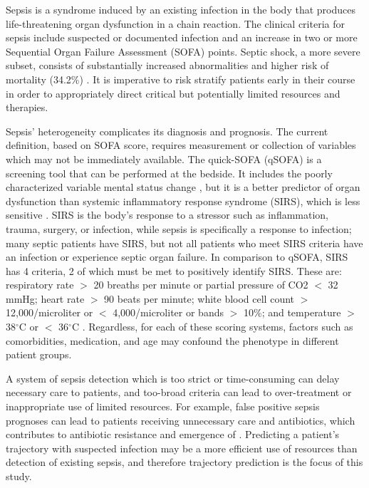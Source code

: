 
Sepsis is a syndrome induced by an existing infection in the body that produces life-threatening organ dysfunction in a chain reaction. The clinical criteria for sepsis include suspected or documented infection and an increase in two or more Sequential Organ Failure Assessment (SOFA) points. Septic shock, a more severe subset, consists of substantially increased abnormalities \cite{sepsis-3} and higher risk of mortality (34.2\%) \cite{paoli_epidemiology_2018}. It is imperative to risk stratify patients early in their course in order to appropriately direct critical but potentially limited resources and therapies.

Sepsis' heterogeneity complicates its diagnosis and prognosis. The current definition, based on SOFA score, requires measurement or collection of variables which may not be immediately available. The quick-SOFA (qSOFA) is a screening tool that can be performed at the bedside. It includes the poorly characterized variable mental status change \cite{sepsis-3}, but it is a better predictor of organ dysfunction than systemic inflammatory response syndrome (SIRS), which is less sensitive \cite{sirs_1992, seymour_assessment_2016}. SIRS is the body's response to a stressor such as inflammation, trauma, surgery, or infection, while sepsis is specifically a response to infection; many septic patients have SIRS, but not all patients who meet SIRS criteria have an infection or experience septic organ failure. In comparison to qSOFA, SIRS has 4 criteria, 2 of which must be met to positively identify SIRS. These are: respiratory rate $>$ 20 breaths per minute or partial pressure of CO2 $<$ 32 mmHg; heart rate $>$ 90 beats per minute; white blood cell count $>$ 12,000/microliter or $<$ 4,000/microliter or bands $>$ 10\%; and temperature $>$38$^{\circ}$C or $<$ 36$^{\circ}$C \cite{sirs_chakraborty_systemic_2022}. Regardless, for each of these scoring systems, factors such as comorbidities, medication, and age may confound the phenotype in different patient groups. 

A system of sepsis detection which is too strict or time-consuming can delay necessary care to patients, and too-broad criteria can lead to over-treatment or inappropriate use of limited resources. For example, false positive sepsis prognoses can lead to patients receiving unnecessary care and antibiotics, which contributes to antibiotic resistance and emergence of  \cite{vanepps_reducing_2018, prestinaci_antimicrobial_2015, chokshi_global_2019}. Predicting a patient's trajectory with suspected infection may be a more efficient use of resources than detection of existing sepsis, and therefore trajectory prediction is the focus of this study. 

